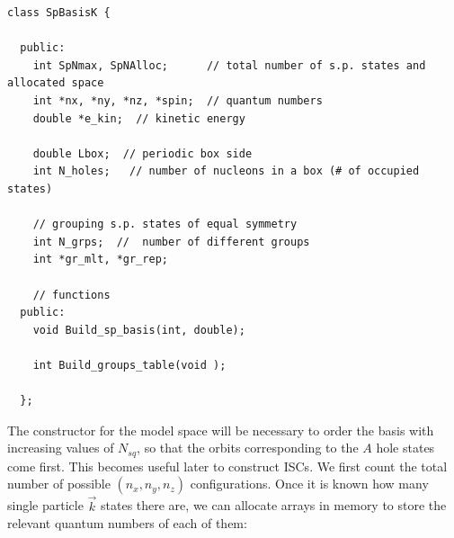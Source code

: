 \lstset{language=c++}
\begin{lstlisting}
class SpBasisK {

  public:
    int SpNmax, SpNAlloc;      // total number of s.p. states and allocated space
    int *nx, *ny, *nz, *spin;  // quantum numbers
    double *e_kin;  // kinetic energy
    
    double Lbox;  // periodic box side
    int N_holes;   // number of nucleons in a box (# of occupied states)  
    
    // grouping s.p. states of equal symmetry
    int N_grps;  //  number of different groups
    int *gr_mlt, *gr_rep;
    
    // functions
  public:
    void Build_sp_basis(int, double);
    
    int Build_groups_table(void );
    
  };
\end{lstlisting}

The constructor for the model space will be necessary to order the basis with increasing values of $N_{sq}$, so that 
the orbits corresponding to the $A$ hole states come first. This becomes useful later to construct ISCs.
%
We first count the total number of possible $(n_x, n_y, n_z)$ configurations. Once it is known how many single particle $\vec k$ states there are, we can allocate arrays in memory to store the relevant quantum numbers of each of them:

